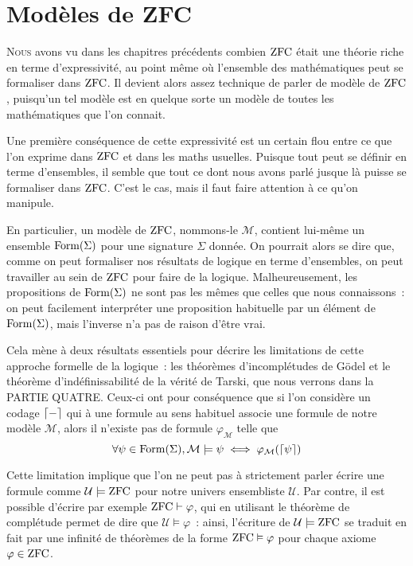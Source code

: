 \chapter{Modèles de ZFC}
\label{chp.modZFC}

\minitoc

\lettrine{N}{ous} avons vu dans les chapitres précédents combien $\operatorname{ZFC}$ était
une théorie riche en terme d'expressivité, au point même où l'ensemble des
mathématiques peut se formaliser dans $\operatorname{ZFC}$. Il devient alors assez technique
de parler de modèle de $\operatorname{ZFC}$, puisqu'un tel modèle est en quelque sorte un
modèle de toutes les mathématiques que l'on connait.

Une première conséquence de cette expressivité est un certain flou entre ce que
l'on exprime dans $\operatorname{ZFC}$ et dans les maths usuelles. Puisque tout peut se
définir en terme d'ensembles, il semble que tout ce dont nous avons parlé jusque
là puisse se formaliser dans $\operatorname{ZFC}$. C'est le cas, mais il faut faire attention
à ce qu'on manipule.

En particulier, un modèle de $\operatorname{ZFC}$, nommons-le $\mathcal M$, contient lui-même
un ensemble $\operatorname{Form}(\Sigma)$ pour une signature $\Sigma$ donnée. On pourrait
alors se dire que, comme on peut formaliser nos résultats de logique en terme
d'ensembles, on peut travailler au sein de $\operatorname{ZFC}$ pour faire de la logique.
Malheureusement, les propositions de $\operatorname{Form}(\Sigma)$ ne sont pas les mêmes
que celles que nous connaissons~: on peut facilement interpréter une proposition
habituelle par un élément de $\operatorname{Form}(\Sigma)$, mais l'inverse n'a pas de
raison d'être vrai.

Cela mène à deux résultats essentiels pour décrire les limitations de cette
approche formelle de la logique~: les théorèmes d'incomplétudes de Gödel et le
théorème d'indéfinissabilité de la vérité de Tarski, que nous verrons dans la
PARTIE QUATRE. Ceux-ci ont pour conséquence que si l'on considère un codage
$\lceil-\rceil$ qui à une formule au sens habituel associe une formule de notre
modèle $\mathcal M$, alors il n'existe pas de formule $\varphi_{\mathcal M}$
telle que
\[\forall \psi \in \operatorname{Form}(\Sigma), \mathcal M \models \psi
\iff \mathcal \varphi_{\mathcal M}(\lceil\psi\rceil)\]

Cette limitation implique que l'on ne peut pas à strictement
parler écrire une formule comme $\mathcal U\models \operatorname{ZFC}$ pour notre univers
ensembliste $\mathcal U$. Par contre, il est possible d'écrire par exemple
$\operatorname{ZFC}\vdash \varphi$, qui en utilisant le théorème de complétude permet de dire
que $\mathcal U \models \varphi$~: ainsi, l'écriture de $\mathcal U\models\operatorname{ZFC}$
se traduit en fait par une infinité de théorèmes de la forme
$\operatorname{ZFC}\vDash \varphi$ pour chaque axiome $\varphi \in \operatorname{ZFC}$.

